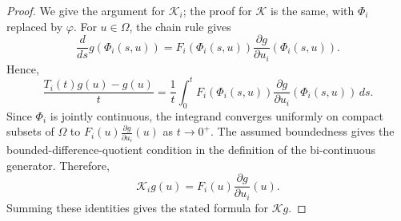 \documentclass[10pt,a4paper]{amsart}
\begin{document}
\begin{proof}
We give the argument for $\mathcal{K}_i$; the proof for $\mathcal{K}$ is the same, with $\Phi_i$ replaced by $\varphi$. For $u\in\Omega$, the chain rule gives
\[
\frac{d}{ds}g(\Phi_i(s,u))
=
F_i(\Phi_i(s,u))
\frac{\partial g}{\partial u_i}(\Phi_i(s,u)).
\]
Hence,
\[
\frac{T_i(t)g(u)-g(u)}{t}
=
\frac{1}{t}\int_0^t
F_i(\Phi_i(s,u))
\frac{\partial g}{\partial u_i}(\Phi_i(s,u))\,ds .
\]
Since $\Phi_i$ is jointly continuous, the integrand converges uniformly on compact subsets of $\Omega$ to $F_i(u)\frac{\partial g}{\partial u_i}(u)$ as $t\to 0^+$. The assumed boundedness gives the bounded-difference-quotient condition in the definition of the bi-continuous generator. Therefore,
\[
\mathcal{K}_i g(u)
=
F_i(u)\frac{\partial g}{\partial u_i}(u).
\]
Summing these identities gives the stated formula for $\mathcal{K}g$.
\end{proof}
\end{document}
